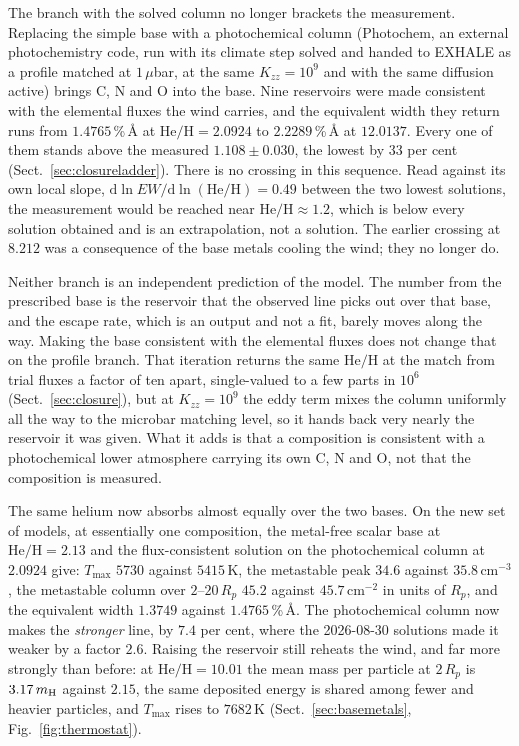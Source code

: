 \documentclass[english,a4paper]{my_memo}
\begin{document}
The branch with the solved column no longer brackets the measurement.
Replacing the simple base with a photochemical column (Photochem, an external
photochemistry code, run with its climate step solved and handed to EXHALE as
a profile matched at $1\,\mu$bar, at the same $K_{zz} = 10^{9}$ and with the
same diffusion active) brings C, N and O into the base. Nine reservoirs were
made consistent with the elemental fluxes the wind carries, and the
equivalent width they return runs from $1.4765$\,\%\,\AA{} at
$\mathrm{He/H} = 2.0924$ to $2.2289$\,\%\,\AA{} at $12.0137$. Every one of
them stands above the measured $1.108 \pm 0.030$, the lowest by $33$ per cent
(Sect.~\ref{sec:closureladder}). There is no crossing in this sequence. Read
against its own local slope, $\mathrm{d}\ln
EW/\mathrm{d}\ln(\mathrm{He/H}) = 0.49$ between the two lowest solutions, the
measurement would be reached near $\mathrm{He/H} \approx 1.2$, which is below
every solution obtained and is an extrapolation, not a solution. The earlier
crossing at $8.212$ was a consequence of the base metals cooling the wind;
they no longer do.

Neither branch is an independent prediction of the model. The number from the
prescribed base is the reservoir that the observed line picks out over that
base, and the escape rate, which is an output and not a fit, barely moves
along the way. Making the base consistent with the elemental fluxes does not
change that on the profile branch. That iteration returns the same
$\mathrm{He/H}$ at the match from trial fluxes a factor of ten apart,
single-valued to a few parts in $10^{6}$ (Sect.~\ref{sec:closure}), but at
$K_{zz} = 10^{9}$ the eddy term mixes the column uniformly all the way to the
microbar matching level, so it hands back very nearly the reservoir it was
given. What it adds is that a composition is consistent with a photochemical
lower atmosphere carrying its own C, N and O, not that the composition is
measured.

The same helium now absorbs almost equally over the two bases. On the new set
of models, at essentially one composition, the metal-free scalar base at
$\mathrm{He/H} = 2.13$ and the flux-consistent solution on the photochemical
column at $2.0924$ give: $T_{\max}$ $5730$ against $5415$\,K, the metastable
peak $34.6$ against $35.8$\,cm$^{-3}$, the metastable column over
$2$--$20\,R_p$ $45.2$ against $45.7$\,cm$^{-2}$ in units of $R_p$, and the
equivalent width $1.3749$ against $1.4765$\,\%\,\AA{}. The photochemical
column now makes the \emph{stronger} line, by $7.4$ per cent, where the
2026-08-30 solutions made it weaker by a factor $2.6$. Raising the reservoir
still reheats the wind, and far more strongly than before: at
$\mathrm{He/H} = 10.01$ the mean mass per particle at $2\,R_p$ is
$3.17\,m_{\rm H}$ against $2.15$, the same deposited energy is shared among
fewer and heavier particles, and $T_{\max}$ rises to $7682$\,K
(Sect.~\ref{sec:basemetals}, Fig.~\ref{fig:thermostat}).
\end{document}
